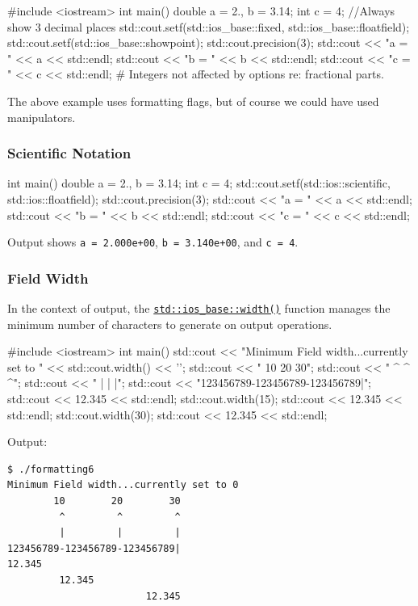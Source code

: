 \documentclass[12pt,letterpaper,twoside]{article}
\begin{document}
\begin{cpp}
#include <iostream>
int main() {
  double a = 2., b = 3.14;
  int c = 4;
  //Always show 3 decimal places
  std::cout.setf(std::ios_base::fixed, std::ios_base::floatfield);
  std::cout.setf(std::ios_base::showpoint);
  std::cout.precision(3);
  std::cout << "a = " << a << std::endl;
  std::cout << "b = " << b << std::endl;
  std::cout << "c = " << c << std::endl;  # Integers not affected by options re: fractional parts.
}
\end{cpp}

The above example uses formatting flags, but of course we could have used manipulators.
\subsubsection{Scientific Notation}
\begin{cpp}
int main() {
  double a = 2., b = 3.14;
  int c = 4;
  std::cout.setf(std::ios::scientific, std::ios::floatfield);
  std::cout.precision(3);
  std::cout << "a = " << a << std::endl;
  std::cout << "b = " << b << std::endl;
  std::cout << "c = " << c << std::endl;
}
\end{cpp}
Output shows \texttt{a = 2.000e+00}, \texttt{b = 3.140e+00}, and \texttt{c = 4}.

\subsubsection{Field Width}
In the context of output, the 
\href{https://en.cppreference.com/w/cpp/io/ios_base/width}{\texttt{std::ios\_base::width()}}
function manages the minimum number of characters to generate on output operations.
\begin{cpp}
#include <iostream>
int main() {
  std::cout << "Minimum Field width...currently set to " <<  std::cout.width() << '\n';
  std::cout << "        10        20        30\n";  
  std::cout << "         ^         ^         ^\n";
  std::cout << "         |         |         |\n";
  std::cout << "123456789-123456789-123456789|\n";
  std::cout << 12.345 << std::endl;
  std::cout.width(15);
  std::cout << 12.345 << std::endl;
  std::cout.width(30);
  std::cout << 12.345 << std::endl;
}
\end{cpp}

Output:

\begin{verbatim}
$ ./formatting6
Minimum Field width...currently set to 0
        10        20        30
         ^         ^         ^
         |         |         |
123456789-123456789-123456789|
12.345
         12.345
                        12.345
\end{verbatim}
\end{document}
